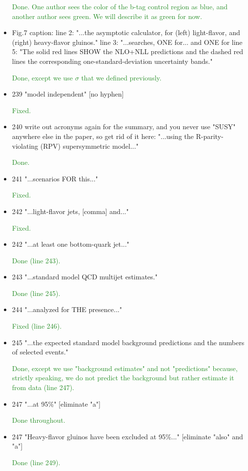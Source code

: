\documentclass[paper=a4, fontsize=11pt]{scrartcl}
\begin{document}
\begin{itemize}
\textcolor{ForestGreen}{Done. One author sees the color of the b-tag control region as
   blue, and another author sees green. We will describe it as green for now.}

\item Fig.7 caption:
 line 2: "...the asymptotic calculator, for (left) light-flavor,
   and (right) heavy-flavor gluinos."
 line 3: "...searches, ONE for... and ONE for
 line 5: "The solid red lines SHOW the NLO+NLL predictions
   and the dashed red lines the corresponding one-standard-deviation
   uncertainty bands."
   
\textcolor{ForestGreen}{Done, except we use $\sigma$ that we defined previously.}

\item 239 "model independent" [no hyphen]

\textcolor{ForestGreen}{Fixed.}

\item 240 write out acronyms again for the summary, and you never use "SUSY"
 anywhere else in the paper, so get rid of it here:
 "...using the R-parity-violating (RPV) supersymmetric model..."
 
\textcolor{ForestGreen}{Done.}

\item 241 "...scenarios FOR this..."

\textcolor{ForestGreen}{Fixed.}

\item 242 "...light-flavor jets, [comma] and..."

\textcolor{ForestGreen}{Fixed.}

\item 242 "...at least one bottom-quark jet..."

\textcolor{ForestGreen}{Done (line 243).}

\item 243 "...standard model QCD multijet estimates."

\textcolor{ForestGreen}{Done (line 245).}

\item 244 "...analyzed for THE presence..."

\textcolor{ForestGreen}{Fixed (line 246).}

\item 245 "...the expected standard model background predictions and
 the numbers of selected events."
 
\textcolor{ForestGreen}{Done, except we use "background estimates" and not "predictions"
because, strictly speaking, we do not predict the background but rather estimate it from data
(line 247).}

\item 247 "...at 95\%" [eliminate "a"]

\textcolor{ForestGreen}{Done throughout.}

\item 247 "Heavy-flavor gluinos have been excluded at 95\%..."
 [eliminate "also" and "a"]
 
\textcolor{ForestGreen}{Done (line 249).}
\end{itemize}
\end{document}
